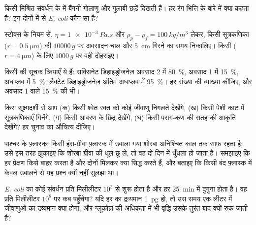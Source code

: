 \begin{exercise}[$\star\star$]\label{exo:b1:cell-unit-of-life:6}
किसी मिश्रित संवर्धन के  में बैंगनी गोलाणु और गुलाबी छड़ें
दिखती हैं। हर रंग  भित्ति के बारे में क्या कहता है? इन दोनों में
से \emph{E. coli} कौन-सा है?
\end{exercise}

\begin{exercise}[$\star\star$]\label{exo:b1:cell-unit-of-life:7}
स्टोक्स के नियम से, $\eta = \qty{1e-3}{Pa.s}$ और $\rho_p - \rho_f =
\qty{100}{kg/m^3}$ लेकर, किसी सूत्रकणिका
($r = \qty{0.5}{\micro m}$) की $\num{10000}\,g$ पर अवसादन चाल और
\qty{5}{cm} गिरने का समय निकालिए। किसी 
($r = \qty{4}{\micro m}$) के लिए $1000\,g$ पर वही दोहराइए।
\end{exercise}

\begin{exercise}[$\star\star$]\label{exo:b1:cell-unit-of-life:8}
किसी  की सूचक क्रियाएँ ये हैं: सक्सिनेट डिहाइड्रोजनेज़ अवसाद 2 में
\qty{80}{\%}, अवसाद 1 में \qty{15}{\%}, अधःप्लव में \qty{5}{\%}; लैक्टेट
डिहाइड्रोजनेज़ अंतिम अधःप्लव में \qty{95}{\%}। हर संख्या की व्याख्या
कीजिए, और अवसाद 1 वाले \qty{15}{\%} की भी।
\end{exercise}

\begin{exercise}[$\star\star$]\label{exo:b1:cell-unit-of-life:9}
किस सूक्ष्मदर्शी से आप (क) किसी श्वेत रक्त  को कोई जीवाणु निगलते
देखेंगे, (ख) किसी पेशी काट में सूत्रकणिकाएँ गिनेंगे, (ग) किसी 
आवरण के छिद्र देखेंगे, (घ) किसी पराग-कण की सतह की आकृति देखेंगे? हर चुनाव
का औचित्य दीजिए।
\end{exercise}

\begin{exercise}[$\star\star\star$]\label{exo:b1:cell-unit-of-life:10}
पाश्चर के फ़्लास्क: किसी हंस-ग्रीवा फ़्लास्क में उबाला गया शोरबा
अनिश्चित काल तक साफ़ रहता है; उसे इस तरह झुकाइए कि शोरबा ग्रीवा की धूल
छू ले, तो वह दो दिन में धुँधला हो जाता है। समझाइए कि हर प्रेक्षण किसे
बाहर करता है और दोनों मिलकर क्या सिद्ध करते हैं, और बताइए कि किसी बंद
फ़्लास्क में केवल उबालने से यह प्रश्न क्यों नहीं सुलझा था।
\end{exercise}

\begin{exercise}[$\star\star\star$]\label{exo:b1:cell-unit-of-life:11}
\emph{E. coli} का कोई संवर्धन प्रति मिलीलीटर $10^3$  से शुरू
होता है और हर \qty{25}{min} में दुगुना होता है। वह प्रति मिलीलीटर $10^8$
पर कब पहुँचेगा? यदि हर  का द्रव्यमान \qty{1}{pg} हो, तो उस समय एक
लीटर में जीवाणुओं का द्रव्यमान क्या होगा, और ग्लूकोज़ की अधिकता में भी
वृद्धि उसके तुरंत बाद क्यों रुक जाती है?
\end{exercise}

